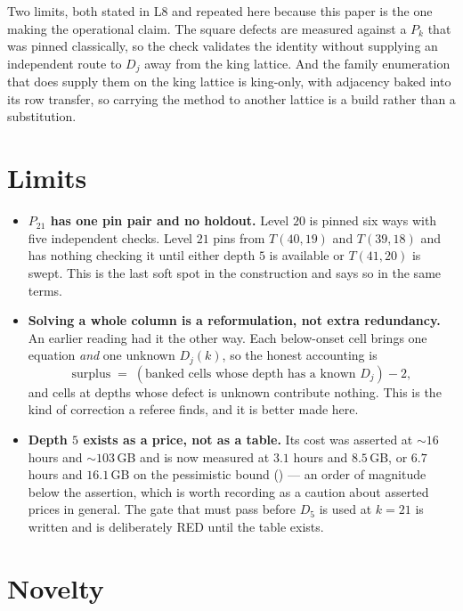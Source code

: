 \documentclass[11pt]{article}
\newcommand{\Dj}{D_j}
\begin{document}
Two limits, both stated in L8 and repeated here because this paper is the one
making the operational claim. The square defects are measured against a $P_k$
that was pinned classically, so the check validates the identity without
supplying an independent route to $D_j$ away from the king lattice. And the
family enumeration that does supply them on the king lattice is king-only, with
adjacency baked into its row transfer, so carrying the method to another lattice
is a build rather than a substitution.

\section{Limits}\label{sec:soft}

\begin{itemize}
\item \textbf{$P_{21}$ has one pin pair and no holdout.} Level $20$ is pinned
six ways with five independent checks. Level $21$ pins from $T(40,19)$ and
$T(39,18)$ and has nothing checking it until either depth $5$ is available or
$T(41,20)$ is swept. This is the last soft spot in the construction and
 says so in the same terms.

\item \textbf{Solving a whole column is a reformulation, not extra redundancy.}
An earlier reading had it the other way. Each below-onset cell brings one
equation \emph{and} one unknown $\Dj(k)$, so the honest accounting is
\[
  \text{surplus} \;=\; (\text{banked cells whose depth has a known } \Dj) - 2,
\]
and cells at depths whose defect is unknown contribute nothing. This is the kind
of correction a referee finds, and it is better made here.

\item \textbf{Depth $5$ exists as a price, not as a table.} Its cost was
asserted at $\sim16$ hours and $\sim103$\,GB and is now measured at $3.1$ hours
and $8.5$\,GB, or $6.7$ hours and $16.1$\,GB on the pessimistic bound
() --- an order of magnitude below the
assertion, which is worth recording as a caution about asserted prices in
general. The gate that must pass before $D_5$ is used at $k = 21$ is written and
is deliberately RED until the table exists.
\end{itemize}

\section{Novelty}\label{sec:novelty}
\end{document}
